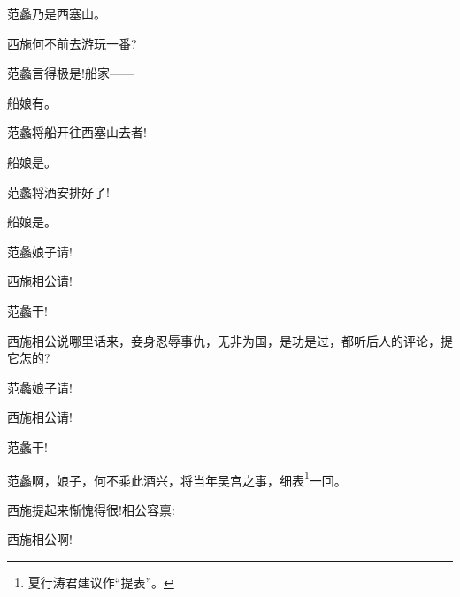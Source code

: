{范蠡\hspace{30pt}乃是西塞山。

西施\hspace{30pt}何不前去游玩一番?

范蠡\hspace{30pt}言得极是!船家------

船娘\hspace{30pt}有。

范蠡\hspace{30pt}将船开往西塞山去者!

船娘\hspace{30pt}是。

范蠡\hspace{30pt}将酒安排好了!

船娘\hspace{30pt}是。

范蠡\hspace{30pt}娘子请!

西施\hspace{30pt}相公请!

范蠡\hspace{30pt}干!


西施\hspace{30pt}相公说哪里话来，妾身忍辱事仇，无非为国，是功是过，都听后人的评论，提它怎的?

范蠡\hspace{30pt}娘子请!

西施\hspace{30pt}相公请!

范蠡\hspace{30pt}干!

范蠡\hspace{30pt}啊，娘子，何不乘此酒兴，将当年吴宫之事，细表\footnote{ 夏行涛{\scriptsize 君}建议作``提表''。}一回。

西施\hspace{30pt}提起来惭愧得很!相公容禀: 


西施\hspace{30pt}相公啊!

}
